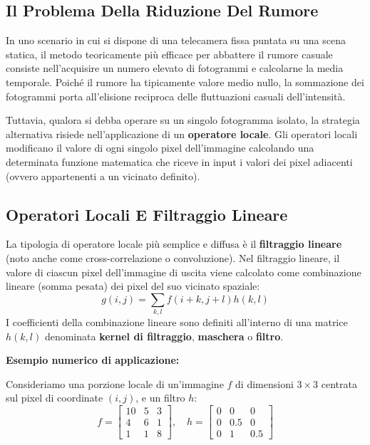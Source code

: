 ﻿\documentclass[11pt, a4paper]{article}
\begin{document}
\subsection{Il Problema Della Riduzione Del Rumore}

In uno scenario in cui si dispone di una telecamera fissa puntata su una scena statica, il metodo teoricamente più efficace per abbattere il rumore casuale consiste nell'acquisire un numero elevato di fotogrammi e calcolarne la media temporale. Poiché il rumore ha tipicamente valore medio nullo, la sommazione dei fotogrammi porta all'elisione reciproca delle fluttuazioni casuali dell'intensità.


Tuttavia, qualora si debba operare su un singolo fotogramma isolato, la strategia alternativa risiede nell'applicazione di un \textbf{operatore locale}. Gli operatori locali modificano il valore di ogni singolo pixel dell'immagine calcolando una determinata funzione matematica che riceve in input i valori dei pixel adiacenti (ovvero appartenenti a un vicinato definito).


\subsection{Operatori Locali E Filtraggio Lineare}

La tipologia di operatore locale più semplice e diffusa è il \textbf{filtraggio lineare} (noto anche come cross-correlazione o convoluzione). Nel filtraggio lineare, il valore di ciascun pixel dell'immagine di uscita viene calcolato come combinazione lineare (somma pesata) dei pixel del suo vicinato spaziale:
\[ g(i,j) = \sum_{k,l} f(i+k, j+l)h(k,l) \]
I coefficienti della combinazione lineare sono definiti all'interno di una matrice $h(k,l)$ denominata \textbf{kernel di filtraggio}, \textbf{maschera} o \textbf{filtro}.

\textbf{Esempio numerico di applicazione:}

Consideriamo una porzione locale di un'immagine $f$ di dimensioni $3 \times 3$ centrata sul pixel di coordinate $(i, j)$, e un filtro $h$:
\[
f = \begin{bmatrix} 10 & 5 & 3 \\ 4 & 6 & 1 \\ 1 & 1 & 8 \end{bmatrix}, \quad
h = \begin{bmatrix} 0 & 0 & 0 \\ 0 & 0.5 & 0 \\ 0 & 1 & 0.5 \end{bmatrix}
\]
\end{document}
